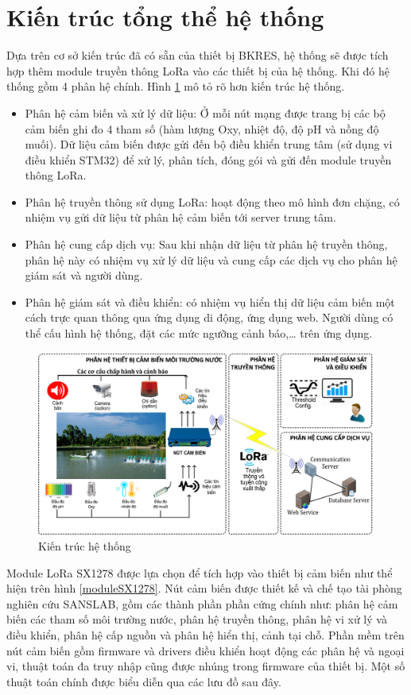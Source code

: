 \section{Kiến trúc tổng thể hệ thống}
Dựa trên cơ sở kiến trúc đã có sẵn của thiết bị BKRES, hệ thống sẽ được tích hợp thêm module truyền thông LoRa vào các thiết bị của hệ thống. Khi đó hệ thống gồm 4 phân hệ chính. Hình \ref{construction}{} mô tỏ rõ hơn kiến trúc hệ thống.
\begin{itemize}
	\item Phân hệ cảm biến và xử lý dữ liệu: Ở mỗi nút mạng được trang bị các bộ cảm biến ghi đo 4 tham số (hàm lượng Oxy, nhiệt độ, độ pH và nồng độ muối). Dữ liệu cảm biến được gửi đến bộ điều khiển trung tâm (sử dụng vi điều khiển STM32) để xử lý, phân tích, đóng gói và gửi đến module truyền thông LoRa.
	\item Phân hệ truyền thông sử dụng LoRa: hoạt động theo mô hình đơn chặng, có nhiệm vụ gửi dữ liệu từ phân hệ cảm biến tới server trung tâm.
	\item Phân hệ cung cấp dịch vụ: Sau khi nhận dữ liệu từ phân hệ truyền thông, phân hệ này có nhiệm vụ xử lý dữ liệu và cung cấp các dịch vụ cho phân hệ giám sát và người dùng.
	\item Phân hệ giám sát và điều khiển: có nhiệm vụ hiển thị dữ liệu cảm biến một cách trực quan thông qua ứng dụng di động, ứng dụng web. Người dùng có thể cấu hình hệ thống, đặt các mức ngưỡng cảnh báo,… trên ứng dụng.
\end{itemize}
\begin{center}
\begin{figure}
\begin{center}
\includegraphics[scale=0.15]{image/kientrucLoRa}
\end{center}
\caption{Kiến trúc hệ thống}
\label{construction}
\end{figure}
\end{center}
\par 
Module LoRa SX1278 được lựa chọn để tích hợp vào thiết bị cảm biến như thể hiện trên hình \ref{moduleSX1278}{}. Nút cảm biến được thiết kế và chế tạo tài phòng nghiên cứu SANSLAB, gồm các thành phần phần cứng chính như: phân hệ cảm biến các tham số môi trường nước, phân hệ truyền thông, phân hệ vi xử lý và điều khiển, phân hệ cấp nguồn và phân hệ hiển thị, cảnh tại chỗ. Phần mềm trên nút cảm biến gồm firmware và drivers điều khiển hoạt động các phân hệ và ngoại vi, thuật toán đa truy nhập cũng được nhúng trong firmware của thiết bị. Một số thuật toán chính được biểu diễn qua các lưu đồ sau đây.
